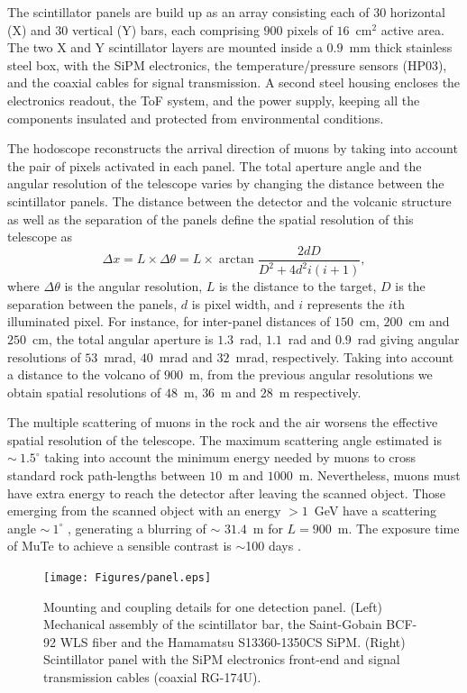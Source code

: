 \documentclass[letterpaper,11pt]{article}
\begin{document}
The scintillator panels are build up as an array consisting each of $30$ horizontal (X) and $30$ vertical (Y) bars, each comprising $900$ pixels of $16$~cm$^2$ active area. The two X and Y scintillator layers are mounted inside a $0.9$~mm thick stainless steel box, with the SiPM electronics, the temperature/pressure sensors (HP03), and the coaxial cables for signal transmission. A second steel housing encloses the electronics readout, the ToF system, and the power supply, keeping all the components insulated and protected from environmental conditions. 

The hodoscope reconstructs the arrival direction of muons by taking into account the pair of pixels activated in each panel. The total aperture angle and the angular resolution of the telescope varies by changing the distance between the scintillator panels. The distance between the detector and the volcanic structure as well as the separation of the panels define the spatial resolution of this telescope as
\begin{equation}
\Delta x=L\times\Delta\theta=L\times \arctan{\frac{2dD}{D^2+4d^2i(i+1)}},
\end{equation}
where $\Delta\theta$ is the angular resolution, $L$ is the distance to the target, $D$ is the separation between the panels, $d$ is pixel width, and $i$ represents the $i$th illuminated pixel. For instance, for inter-panel distances of $150$~cm, $200$~cm and $250$~cm, the total angular aperture is $1.3$~rad, $1.1$~rad and $0.9$~rad giving angular resolutions of $53$~mrad, $40$~mrad and $32$~mrad, respectively. Taking into account a distance to the volcano of $900$~m, from the previous angular resolutions we obtain spatial resolutions of $48$~m, $36$~m and $28$~m respectively.

The multiple scattering of muons in the rock and the air worsens the effective spatial resolution of the telescope. The maximum scattering angle estimated is $\sim~1.5^{\circ}$ taking into account the minimum energy needed by muons to cross standard rock path-lengths between $10$~m and $1000$~m. Nevertheless, muons must have extra energy to reach the detector after leaving the scanned object. Those emerging from the scanned object with an energy $>1$~GeV have a scattering angle $\sim~1^{\circ}$ \cite{Suarez2019}, generating a blurring of $\sim$ $31.4$~m for $L=900$~m. The exposure time of MuTe to achieve a sensible contrast is $\sim$100 days \cite{AsoreyEtal2017B}.


\begin{figure}[htb]
\centering
\texttt{[image: Figures/panel.eps]}
\caption{Mounting and coupling details for one detection panel. (Left) Mechanical assembly of the scintillator bar, the Saint-Gobain BCF-92 WLS fiber and the Hamamatsu S13360-1350CS SiPM. (Right) Scintillator panel with the SiPM electronics front-end and signal transmission cables (coaxial RG-174U).}
\label{fig:frame}
\end{figure}
\end{document}
